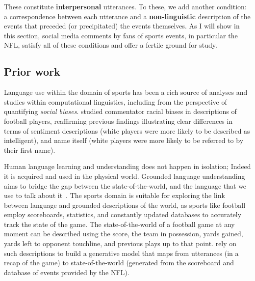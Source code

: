 These constitute \textbf{interpersonal} utterances. To these, we add another condition: a correspondence between each utterance and a \textbf{non-linguistic} description of the events that preceded (or precipitated) the events themselves. As I will show in this section, social media comments by fans of sports events, in particular the NFL, satisfy all of these conditions and offer a fertile ground for study.

\subsection{Prior work} 


Language use within the domain of sports has been a rich source of analyses and studies within computational linguistics, including from the perspective of quantifying \emph{social biases}. \citet{merullo-etal-2019-investigating} studied commentator racial biases in descriptions of football players, reaffirming previous findings illustrating clear differences in terms of sentiment descriptions (white players were more likely to be described as intelligent), and name itself (white players were more likely to be referred to by their first name). 

Human language learning and understanding does not happen in isolation; Indeed it is acquired and used in the physical world. Grounded language understanding aims to bridge the gap between the state-of-the-world, and the language that we use to talk about it~\citep{krishnamurthy2013jointly}. The sports domain is suitable for exploring the link between language and grounded descriptions of the world, as sports like football employ scoreboards, statistics, and constantly updated databases to accurately track the state of the game. The state-of-the-world of a football game at any moment can be described using the score, the team in possession, yards gained, yards left to opponent touchline, and previous plays up to that point. \citet{liang-etal-2009-learning} rely on such descriptions to build a generative model that maps from utterances (in a recap of the game) to state-of-the-world (generated from the scoreboard and database of events provided by the NFL).

